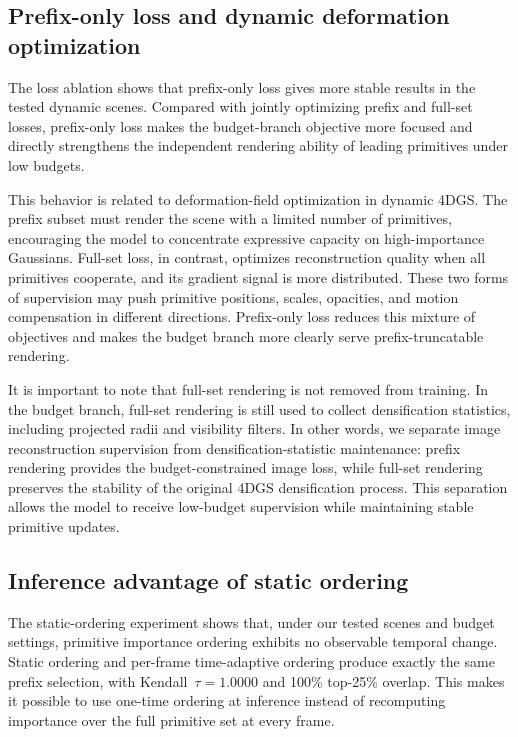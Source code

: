 \documentclass[pdflatex,sn-mathphys]{sn-jnl}
\begin{document}
\subsection{Prefix-only loss and dynamic deformation optimization}

The loss ablation shows that prefix-only loss gives more stable results in the tested dynamic scenes. Compared with jointly optimizing prefix and full-set losses, prefix-only loss makes the budget-branch objective more focused and directly strengthens the independent rendering ability of leading primitives under low budgets.

This behavior is related to deformation-field optimization in dynamic 4DGS. The prefix subset must render the scene with a limited number of primitives, encouraging the model to concentrate expressive capacity on high-importance Gaussians. Full-set loss, in contrast, optimizes reconstruction quality when all primitives cooperate, and its gradient signal is more distributed. These two forms of supervision may push primitive positions, scales, opacities, and motion compensation in different directions. Prefix-only loss reduces this mixture of objectives and makes the budget branch more clearly serve prefix-truncatable rendering.

It is important to note that full-set rendering is not removed from training. In the budget branch, full-set rendering is still used to collect densification statistics, including projected radii and visibility filters. In other words, we separate image reconstruction supervision from densification-statistic maintenance: prefix rendering provides the budget-constrained image loss, while full-set rendering preserves the stability of the original 4DGS densification process. This separation allows the model to receive low-budget supervision while maintaining stable primitive updates.

\subsection{Inference advantage of static ordering}

The static-ordering experiment shows that, under our tested scenes and budget settings, primitive importance ordering exhibits no observable temporal change. Static ordering and per-frame time-adaptive ordering produce exactly the same prefix selection, with Kendall~$\tau=1.0000$ and 100\% top-25\% overlap. This makes it possible to use one-time ordering at inference instead of recomputing importance over the full primitive set at every frame.
\end{document}
